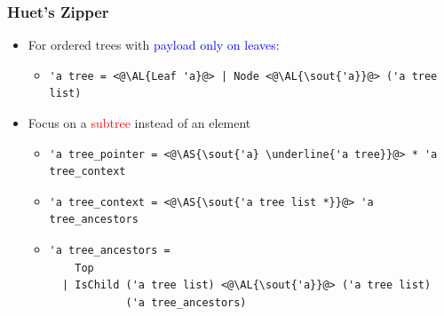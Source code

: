 \begin{frame}[fragile]
\frametitle{Huet's Zipper}

\newcommand{\AS}[1]{\textcolor{red}{#1}}
\newcommand{\AL}[1]{\textcolor{blue}{#1}}

\begin{itemize}
\item For ordered trees with \AL{payload only on leaves}:

\begin{itemize}
\item
\begin{lstlisting}
'a tree = <@\AL{Leaf 'a}@> | Node <@\AL{\sout{'a}}@> ('a tree list)
\end{lstlisting}
\end{itemize}

\item Focus on a \AS{subtree} instead of an element

\begin{itemize}
\item
\begin{lstlisting}
'a tree_pointer = <@\AS{\sout{'a} \underline{'a tree}}@> * 'a tree_context
\end{lstlisting}

\item 
\begin{lstlisting}
'a tree_context = <@\AS{\sout{'a tree list *}}@> 'a tree_ancestors
\end{lstlisting}

\item 
\begin{lstlisting}
'a tree_ancestors =
    Top
  | IsChild ('a tree list) <@\AL{\sout{'a}}@> ('a tree list)
            ('a tree_ancestors)
\end{lstlisting}

\end{itemize} 

\end{itemize}
\end{frame}

